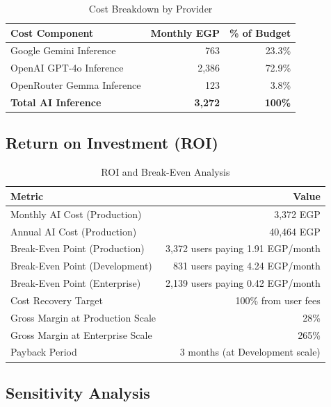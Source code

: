 \documentclass[11pt,a4paper]{article}
\begin{document}
\begin{table}[H]
\centering
\begin{tabular}{|l|r|r|}
\hline
\textbf{Cost Component} & \textbf{Monthly EGP} & \textbf{\% of Budget} \\
\hline
Google Gemini Inference & 763 & 23.3\% \\
\hline
OpenAI GPT-4o Inference & 2,386 & 72.9\% \\
\hline
OpenRouter Gemma Inference & 123 & 3.8\% \\
\hline
\textbf{Total AI Inference} & \textbf{3,272} & \textbf{100\%} \\
\hline
\end{tabular}
\caption{Cost Breakdown by Provider}
\end{table}

\subsection{Return on Investment (ROI)}

\begin{table}[H]
\centering
\begin{tabular}{|l|r|}
\hline
\textbf{Metric} & \textbf{Value} \\
\hline
Monthly AI Cost (Production) & 3,372 EGP \\
\hline
Annual AI Cost (Production) & 40,464 EGP \\
\hline
Break-Even Point (Production) & 3,372 users paying 1.91 EGP/month \\
\hline
Break-Even Point (Development) & 831 users paying 4.24 EGP/month \\
\hline
Break-Even Point (Enterprise) & 2,139 users paying 0.42 EGP/month \\
\hline
Cost Recovery Target & 100\% from user fees \\
\hline
Gross Margin at Production Scale & 28\% \\
\hline
Gross Margin at Enterprise Scale & 265\% \\
\hline
Payback Period & 3 months (at Development scale) \\
\hline
\end{tabular}
\caption{ROI and Break-Even Analysis}
\end{table}

\subsection{Sensitivity Analysis}
\end{document}
